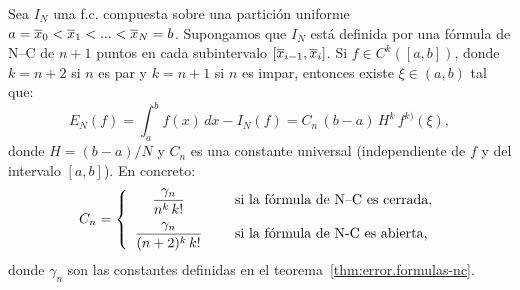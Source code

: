 \begin{theorem}
  \label{thm:cota.error.fc.compuestas-nc}
  Sea $I_N$ una f.c. compuesta sobre una partición uniforme
  $a=\overline x_0<\overline x_1<...<\overline x_N=b$. Supongamos que $I_N$ está definida por una
  fórmula de N--C de $n+1$ puntos en cada subintervalo
  $[\overline x_{i-1},\overline x_i]$.  Si $f\in C^k([a,b])$, donde $k=n+2$ si $n$ es par
  y $k=n+1$ si $n$ es impar, entonces existe $\xi\in(a,b)$ tal que:
  \begin{equation}
    \label{eq:error.fc.compuesta-NC}
   E_N(f)= \int_a^bf(x)\,dx - I_N(f)
   = C_n \, (b-a) \, H^{k} \, f^{k)}(\xi),
  \end{equation}
  donde $H=(b-a)/N$ y $C_n$ es una constante universal (independiente
  de $f$ y del intervalo $[a,b]$). En concreto:
  \begin{equation*}
  C_n=\left\{
    \begin{array}{cl}
      \displaystyle\frac{\gamma_n}{n^k\,k!} & \quad \text{ si la fórmula de N--C es
        cerrada},
      \\ \noalign{\medskip}
      \displaystyle\displaystyle\frac{\gamma_n}{(n+2)^k\,k!} &\quad \text{ si la fórmula
        de N-C es abierta},
    \end{array}
  \right.
\end{equation*}
  donde $\gamma_n$ son las constantes definidas en el
  teorema~\ref{thm:error.formulas-nc}.
\end{theorem}

